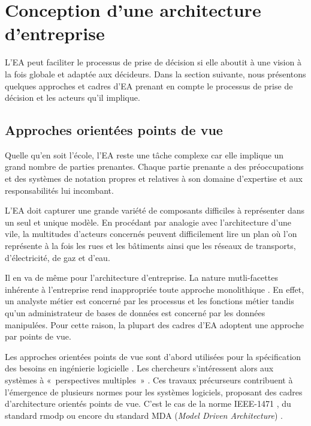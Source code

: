 \section{Conception d'une architecture d'entreprise}

L'EA peut faciliter le processus de prise de décision si elle aboutit à une
vision à la fois globale et adaptée aux décideurs. Dans la section suivante, nous
présentons quelques approches et cadres d'EA prenant en compte le processus de
prise de décision et les acteurs qu'il implique.

\subsection{Approches orientées points de vue}

Quelle qu'en soit l'école, l'EA reste une tâche complexe
\cite{steen2004supporting} car elle implique un grand nombre de parties
prenantes. Chaque partie prenante a des préoccupations et des systèmes de
notation propres et relatives à son domaine d'expertise et aux responsabilités lui
incombant.

L'EA doit capturer une grande variété de composants difficiles à représenter
dans un seul et unique modèle. En procédant par analogie avec l'architecture
d'une vile, la multitudes d'acteurs concernés peuvent difficilement lire un plan où l'on
représente à la fois les rues et les bâtiments ainsi que les réseaux de
transports, d'électricité, de gaz et d'eau. 

Il en va de même pour l'architecture d'entreprise. La nature mutli-facettes
inhérente à l'entreprise rend inappropriée toute approche monolithique
\cite{armour1999bigpicture}. En effet, un analyste métier est concerné par les
processus et les fonctions métier tandis qu'un administrateur de bases de
données est concerné par les données manipulées. Pour cette raison, la plupart des
cadres d'EA adoptent une approche par points de vue.

Les approches orientées points de vue sont d'abord utilisées pour la
spécification des besoins en ingénierie logicielle \cite{mullery1979core}. Les
chercheurs s'intéressent alors aux systèmes à «~perspectives multiples~»
\cite{finkelstein1992viewpoints} \cite{kotonya1996requirements}
\cite{nuseibeh1994multi} \cite{meyers1993representing}. Ces travaux précurseurs
contribuent à l'émergence de plusieurs normes pour les systèmes logiciels,
proposant des cadres d'architecture orientés points de vue. C'est le cas de la
norme IEEE-1471 \cite{hilliard2000ieee}, du standard \gls{rmodp}
\cite{raymond1995reference} ou encore du standard MDA (\textit{Model Driven
Architecture}) \cite{kleppe2003mda}.

